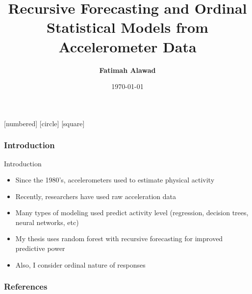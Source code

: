 \documentclass[serif]{beamer}
\begin{document}
[numbered]
[circle]
[square]
\theoremstyle{definition}
\newtheorem*{exs}{Examples}
\newtheorem{ex}{Example}
\newtheorem*{exc}{Exercise}
\setlength{\parindent}{0pt}

\title{Recursive Forecasting and Ordinal Statistical Models from Accelerometer Data}
\author{\textbf{Fatimah Alawad}}
\date{\today}

{ %


\begin{frame}[plain]
\titlepage
\end{frame}
} %

\begin{frame}
\frametitle{Introduction}
\begin{block}{Introduction}
\begin{itemize}
\item Since the 1980’s, accelerometers used to estimate  physical activity
\item Recently, researchers have used raw acceleration data
\item Many types of modeling used predict activity level (regression, decision trees, neural networks, etc)
\item My thesis uses random forest with recursive forecasting for improved predictive power
\item Also, I consider ordinal nature of responses
\end{itemize}
\end{block}
\end{frame}

\begin{frame}[allowframebreaks]
        \frametitle{References}
        
        
\end{frame}


 
\end{document}

